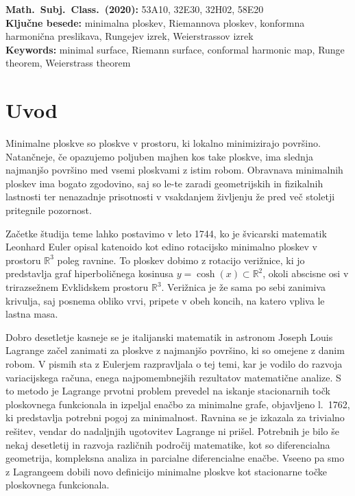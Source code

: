 \documentclass[12pt,a4paper,twoside]{article}
\newcommand{\kljucnebesede}{minimalna ploskev\sep Riemannova ploskev\sep konformna harmonična preslikava\sep Rungejev izrek\sep Weierstrassov izrek} %
\newcommand{\keywords}{minimal surface\sep Riemann surface\sep conformal harmonic map\sep Runge theorem\sep Weierstrass theorem} %
\newcommand{\sep}{, }  %
\theoremstyle{definition} %
\theoremstyle{plain} %
\numberwithin{equation}{section}  %
\newcommand{\R}{\mathbb R}
\begin{document}
\vfill\noindent
\textbf{Math.~Subj.~Class.~(2020):} 53A10, 32E30, 32H02, 58E20 \\[1mm]
\textbf{Ključne besede:} \kljucnebesede \\[1mm]
\textbf{Keywords:} \keywords

\cleardoublepage

\setcounter{page}{1}    %

\section{Uvod}

Minimalne ploskve so ploskve v prostoru, ki lokalno minimizirajo površino. Natančneje, če opazujemo poljuben majhen kos take ploskve, ima slednja najmanjšo površino med vsemi ploskvami z istim robom.
Obravnava minimalnih ploskev ima bogato zgodovino, saj so le-te zaradi geometrijskih in fizikalnih lastnosti ter nenazadnje prisotnosti v vsakdanjem življenju že pred več stoletji pritegnile pozornost.

Začetke študija teme lahko postavimo v leto 1744, ko je švicarski matematik Leonhard Euler opisal katenoido kot edino rotacijsko minimalno ploskev v prostoru $\R^3$ poleg ravnine. To ploskev dobimo z rotacijo verižnice, ki jo predstavlja graf hiperboličnega kosinusa $y = \cosh(x) \subset \R^2$, okoli abscisne osi v trirazsežnem Evklidskem prostoru $\R^3$. Verižnica je že sama po sebi zanimiva krivulja, saj posnema obliko vrvi, pripete v obeh koncih, na katero vpliva le lastna masa.

Dobro desetletje kasneje se je italijanski matematik in astronom Joseph Louis Lagrange začel zanimati za ploskve z najmanjšo površino, ki so omejene z danim robom. V pismih sta z Eulerjem razpravljala o tej temi, kar je vodilo do razvoja variacijskega računa, enega najpomembnejših rezultatov matematične analize. S to metodo je Lagrange prvotni problem prevedel na iskanje stacionarnih točk ploskovnega funkcionala in izpeljal enačbo za minimalne grafe, objavljeno l.~1762, ki predstavlja potrebni pogoj za minimalnost. Ravnina se je izkazala za trivialno rešitev, vendar do nadaljnjih ugotovitev Lagrange ni prišel. Potrebnih je bilo še nekaj desetletij in razvoja različnih področij matematike, kot so diferencialna geometrija, kompleksna analiza in parcialne diferencialne enačbe. Vseeno pa smo z Lagrangeem dobili novo definicijo minimalne ploskve kot stacionarne točke ploskovnega funkcionala.
\end{document}
